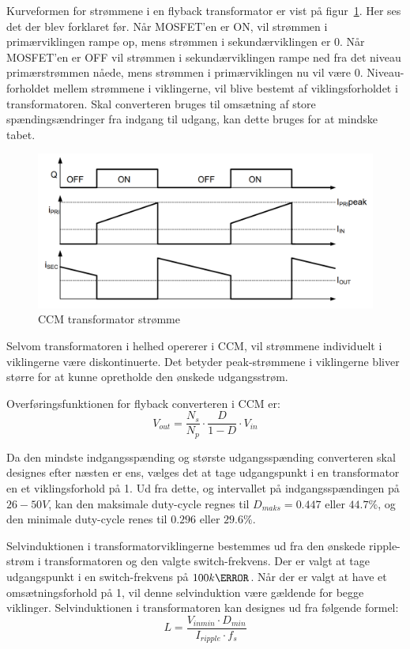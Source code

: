 Kurveformen for strømmene i en flyback transformator er vist på figur~\ref{fig:flyabck_ideal_currents}. Her ses det der blev forklaret før. Når MOSFET'en er ON, vil strømmen i primærviklingen rampe op, mens strømmen i sekundærviklingen er 0. Når MOSFET'en er OFF vil strømmen i sekundærviklingen rampe ned fra det niveau primærstrømmen nåede, mens strømmen i primærviklingen nu vil være 0. Niveau-forholdet mellem strømmene i viklingerne, vil blive bestemt af viklingsforholdet i transformatoren. Skal converteren bruges til omsætning af store spændingsændringer fra indgang til udgang, kan dette bruges for at mindske tabet. 

\begin{figure}[H]
	\centering
	\includegraphics[width=0.7\linewidth]{../Dokumentation/tex/1iteration/billeder/CCM_transformer_current.png}
	\caption{CCM transformator strømme}
	\label{fig:flyabck_ideal_currents}
\end{figure}

\noindent Selvom transformatoren i helhed opererer i CCM, vil strømmene individuelt i viklingerne være diskontinuerte. Det betyder peak-strømmene i viklingerne bliver større for at kunne opretholde den ønskede udgangsstrøm. 

\noindent Overføringsfunktionen for flyback converteren i CCM er\cite{SMPS-topologies2}:
\begin{equation*}
	V_{out} = \frac{N_s}{N_p} \cdot \frac{D}{1-D} \cdot V_{in}
\end{equation*}

Da den mindste indgangsspænding og største udgangsspænding converteren skal designes efter næsten er ens, vælges det at tage udgangspunkt i en transformator en et viklingsforhold på 1. Ud fra dette, og intervallet på indgangsspændingen på $26-50V$, kan den maksimale duty-cycle regnes til $D_{maks} = 0.447$ eller $44.7\percent$, og den minimale duty-cycle renes til $0.296$ eller $29.6\percent$.  

Selvinduktionen i transformatorviklingerne bestemmes ud fra den ønskede ripple-strøm i transformatoren og den valgte switch-frekvens. Der er valgt at tage udgangspunkt i en switch-frekvens på $100k\hertz$. Når der er valgt at have et omsætningsforhold på 1, vil denne selvinduktion være gældende for begge viklinger. Selvinduktionen i transformatoren kan designes ud fra følgende formel\cite{flyback-formler}:
\begin{equation}
	L = \frac{V_{inmin} \cdot D_{min}}{I_{ripple} \cdot f_s}
\end{equation}

